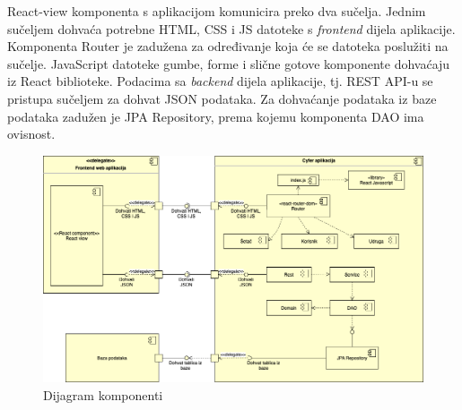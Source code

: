 			React-view komponenta s aplikacijom komunicira preko dva sučelja. Jednim sučeljem dohvaća potrebne HTML, CSS i JS datoteke s \textit{frontend} dijela aplikacije. Komponenta Router je zadužena za određivanje koja će se datoteka poslužiti na sučelje. JavaScript datoteke gumbe, forme i slične gotove komponente dohvaćaju iz React biblioteke. Podacima sa \textit{backend} dijela aplikacije, tj. REST API-u se pristupa sučeljem za dohvat JSON podataka. Za dohvaćanje podataka iz baze podataka zadužen je JPA Repository, prema kojemu komponenta DAO ima ovisnost.
			\newpage
			\begin{figure}[H]
				\includegraphics[width=1\textwidth]{dijagrami/Component-diagram-2.png} %
				\caption{Dijagram komponenti}
				\label{fig:Act1} %
			\end{figure}